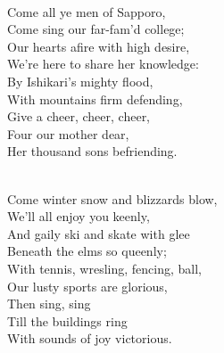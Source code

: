 \documentclass[10pt,b5j]{tarticle} %
\begin{document}
\vspace{1.5em} %
\newcommand{\linespace}{0.5em} %
\newcommand{\blocksize}{0.5\hsize} %
\newcommand{\itemmargin}{3em} %
\begin{enumerate} %
    \setlength{\itemindent}{\itemmargin} %
    \begin{minipage}[c]{\blocksize}
    
        \vspace{\linespace}
        \item~\\
        Come all ye men of Sapporo,\\
          Come sing our far-fam'd college;\\
        Our hearts afire with high desire,\\
          We're here to share her knowledge:\\
        By Ishikari's mighty flood,\\
          With mountains firm defending,\\
            Give a cheer, cheer, cheer,\\
            Four our mother dear,\\
          Her thousand sons befriending.
        
    \end{minipage}
    \begin{minipage}[c]{\blocksize}
        
        \vspace{\linespace}
        \item~\\
        Come winter snow and blizzards blow,\\
          We'll all enjoy you keenly,\\
        And gaily ski and skate with glee\\
          Beneath the elms so queenly;\\
        With tennis, wresling, fencing, ball,\\
          Our lusty sports are glorious,\\
            Then sing, sing\\
            Till the buildings ring\\
        With sounds of joy victorious.
        
    \end{minipage}
    \begin{minipage}[c]{\blocksize}
        

\end{minipage}
\end{enumerate}
\end{document}
